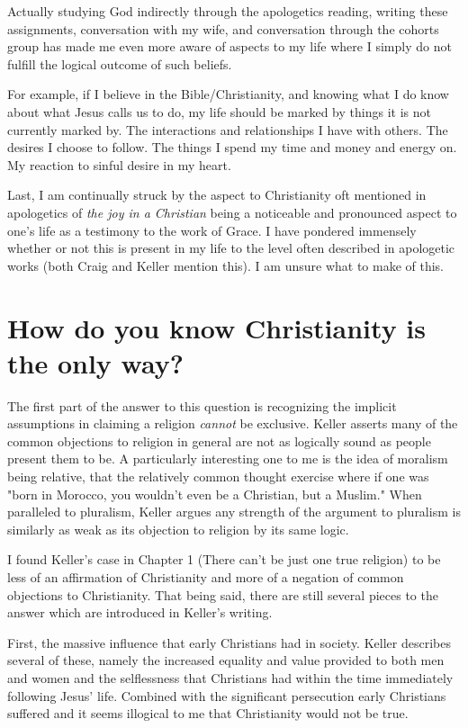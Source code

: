 \documentclass[12pt]{turabian-researchpaper}
\begin{document}
Actually studying God indirectly through the apologetics reading, writing these assignments, conversation with my wife, and conversation through the cohorts group has made me even more aware of aspects to my life where I simply do not fulfill the logical outcome of such beliefs. 

For example, if I believe in the Bible/Christianity, and knowing what I do know about what Jesus calls us to do, my life should be marked by things it is not currently marked by. The interactions and relationships I have with others. The desires I choose to follow. The things I spend my time and money and energy on. My reaction to sinful desire in my heart.

Last, I am continually struck by the aspect to Christianity oft mentioned in apologetics of \textit{the joy in a Christian} being a noticeable and pronounced aspect to one's life as a testimony to the work of Grace. I have pondered immensely whether or not this is present in my life to the level often described in apologetic works (both Craig and Keller mention this). I am unsure what to make of this.

\section{How do you know Christianity is the only way?}

The first part of the answer to this question is recognizing the implicit assumptions in claiming a religion \textit{cannot} be exclusive. Keller asserts many of the common objections to religion in general are not as logically sound as people present them to be.\autocite[pg.5-17]{keller2008reason} A particularly interesting one to me is the idea of moralism being relative, that the relatively common thought exercise where if one was "born in Morocco, you wouldn't even be a Christian, but a Muslim."\autocite[pg.11]{keller2008reason} When paralleled to pluralism, Keller argues any strength of the argument to pluralism is similarly as weak as its objection to religion by its same logic.

I found Keller's case in Chapter 1 (There can't be just one true religion) to be less of an affirmation of Christianity and more of a negation of common objections to Christianity. That being said, there are still several pieces to the answer which are introduced in Keller's writing.

First, the massive influence that early Christians had in society. Keller describes several of these, namely the increased equality and value provided to both men and women and the selflessness that Christians had within the time immediately following Jesus' life\autocite[pg.21]{keller2008reason}. Combined with the significant persecution early Christians suffered and it seems illogical to me that Christianity would not be true. 
\end{document}

